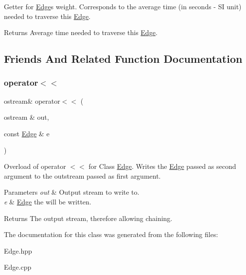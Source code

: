 Getter for \hyperlink{class_edge}{Edge}\textquotesingle{}s weight. Corresponds to the average time (in seconds -\/ SI unit) needed to traverse this \hyperlink{class_edge}{Edge}.

\begin{DoxyReturn}{Returns}
Average time needed to traverse this \hyperlink{class_edge}{Edge}. 
\end{DoxyReturn}


\subsection{Friends And Related Function Documentation}
\hypertarget{class_edge_a4ba287cbdc78be9ec49dd1b67291039b}{}\label{class_edge_a4ba287cbdc78be9ec49dd1b67291039b} 
\subsubsection{\texorpdfstring{operator$<$$<$}{operator<<}}
{\footnotesize\ttfamily ostream\& operator$<$$<$ (\begin{DoxyParamCaption}\item[{ostream \&}]{out,  }\item[{const \hyperlink{class_edge}{Edge} \&}]{e }\end{DoxyParamCaption})\hspace{0.3cm}{\ttfamily [friend]}}

Overload of operator $<$$<$ for Class \hyperlink{class_edge}{Edge}. Writes the \hyperlink{class_edge}{Edge} passed as second argument to the outstream passed as first argument.


\begin{DoxyParams}{Parameters}
{\em out} & Output stream to write to. \\
\hline
{\em e} & \hyperlink{class_edge}{Edge} the will be written.\\
\hline
\end{DoxyParams}
\begin{DoxyReturn}{Returns}
The output stream, therefore allowing chaining. 
\end{DoxyReturn}


The documentation for this class was generated from the following files\+:\begin{DoxyCompactItemize}
\item 
Edge.\+hpp\item 
Edge.\+cpp\end{DoxyCompactItemize}
